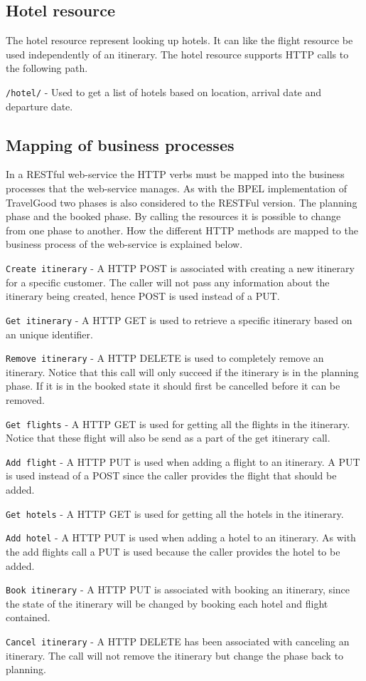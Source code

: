 \subsection{Hotel resource}
The hotel resource represent looking up hotels. It can like the flight resource be used independently of an itinerary. The hotel resource supports HTTP calls to the following path.
\begin{description}
	\item \texttt{/hotel/} - Used to get a list of hotels based on location, arrival date and departure date.
\end{description}

\subsection{Mapping of business processes}
In a RESTful web-service the HTTP verbs must be mapped into the business processes that the web-service manages. As with the BPEL implementation of TravelGood two phases is also considered to the RESTFul version. The planning phase and the booked phase. By calling the resources it is possible to change from one phase to another. How the different HTTP methods are mapped to the business process of the web-service is explained below.
\begin{description}
	\item \texttt{Create itinerary} - A HTTP POST is associated with creating a new itinerary for a specific customer. The caller will not pass any information about the itinerary being created, hence POST is used instead of a PUT. 
	\item \texttt{Get itinerary} - A HTTP GET is used to retrieve a specific itinerary based on an unique identifier.
	\item \texttt{Remove itinerary} - A HTTP DELETE is used to completely remove an itinerary. Notice that this call will only succeed if the itinerary is in the planning phase. If it is in the booked state it should first be cancelled before it can be removed.
	\item \texttt{Get flights} - A HTTP GET is used for getting all the flights in the itinerary. Notice that these flight will also be send as a part of the get itinerary call.
	\item \texttt{Add flight} - A HTTP PUT is used when adding a flight to an itinerary. A PUT is used instead of a POST since the caller provides the flight that should be added.
	\item \texttt{Get hotels} -  A HTTP GET is used for getting all the hotels in the itinerary.
	\item \texttt{Add hotel} - A HTTP PUT is used when adding a hotel to an itinerary. As with the add flights call a PUT is used because the caller provides the hotel to be added.
	\item \texttt{Book itinerary} - A HTTP PUT is associated with booking an itinerary, since the state of the itinerary will be changed by booking each hotel and flight contained.
	\item \texttt{Cancel itinerary} - A HTTP DELETE has been associated with canceling an itinerary. The call will not remove the itinerary but change the phase back to planning.
\end{description}
